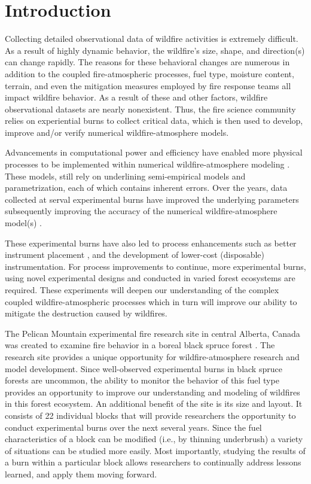 \documentclass[preprints,article,accept,moreauthors,pdftex]{Definitions/mdpi}
\begin{document}
\section{Introduction}


Collecting detailed observational data of wildfire activities is extremely difficult. As a result of highly dynamic behavior, the wildfire's size, shape, and direction(s) can change rapidly. The reasons for these behavioral changes are numerous in addition to the coupled fire-atmospheric processes, fuel type, moisture content, terrain, and even the mitigation measures employed by fire response teams all impact wildfire behavior. As a result of these and other factors, wildfire observational datasets are nearly nonexistent. Thus, the fire science community relies on experiential burns to collect critical data, which is then used to develop, improve and/or verify numerical wildfire-atmosphere models.

Advancements in computational power and efficiency have enabled more physical processes to be implemented within numerical wildfire-atmosphere modeling \cite{kochanski_experimental_2018}. These models, still rely on underlining semi-empirical models and parametrization, each of which contains inherent errors. Over the years, data collected at serval experimental burns have improved the underlying parameters subsequently improving the accuracy of the numerical wildfire-atmosphere model(s) \cite{kochanski_experimental_2018,mallia_incorporating_2020,kochanski_evaluation_2013,coen_requirements_2018}.

These experimental burns have also led to process enhancements such as better instrument placement \cite{kochanski_experimental_2018}, and the development of lower-cost (disposable) instrumentation. For process improvements to continue, more experimental burns, using novel experimental designs and conducted in varied forest ecosystems are required. These experiments will deepen our understanding of the complex coupled wildfire-atmospheric processes which in turn will improve our ability to mitigate the destruction caused by wildfires.

The Pelican Mountain experimental fire research site in central Alberta, Canada was created to examine fire behavior in a boreal black spruce forest \cite{thompson_recent_2020}. The research site provides a unique opportunity for wildfire-atmosphere research and model development. Since well-observed experimental burns in black spruce forests are uncommon, the ability to monitor the behavior of this fuel type provides an opportunity to improve our understanding and modeling of wildfires in this forest ecosystem. An additional benefit of the site is its size and layout. It consists of 22 individual blocks that will provide researchers the opportunity to conduct experimental burns over the next several years. Since the fuel characteristics of a block can be modified (i.e., by thinning underbrush) a variety of situations can be studied more easily. Most importantly, studying the results of a burn within a particular block allows researchers to continually address lessons learned, and apply them moving forward.
\end{document}
